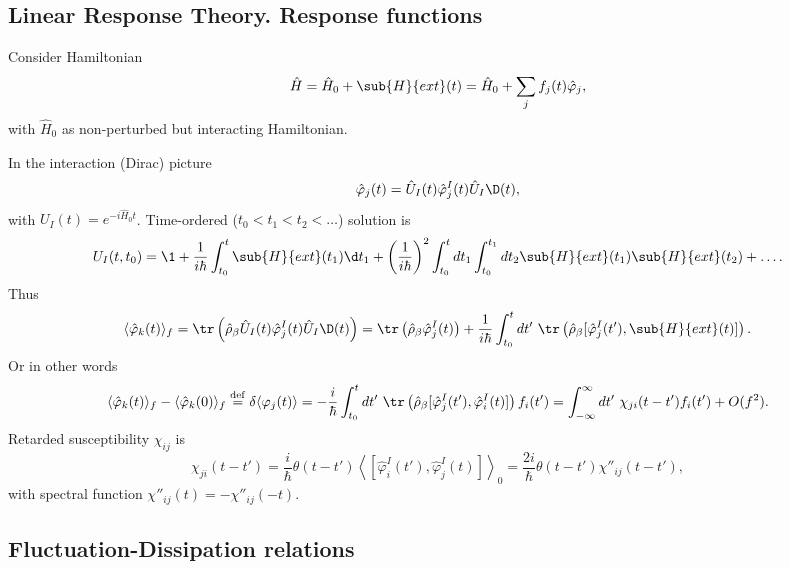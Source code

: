 \subsection*{Linear Response Theory. Response functions}

Consider Hamiltonian
\begin{equation*}
	\hat{H} = \hat{H}_0 + \sub{H}{ext}(t) = \hat{H}_0 + \sum_j f_j(t) \hat{\varphi}_j,
\end{equation*}
with $\hat{H}_0$ as non-perturbed but interacting Hamiltonian. 

In the interaction (Dirac) picture
\begin{equation*}
	\hat{\varphi}_j (t) = \hat{U}_I(t) \hat{\varphi}^I_j(t) \hat{U}_I\D(t),
\end{equation*}
with $U_I(t) = e^{- i \hat{H}_0 t}$. Time-ordered ($t_0 < t_1 < t_2 < \ldots$) solution is
\begin{equation*}
	U_I(t, t_0) = \1 + \frac{1}{i \hbar} \int_{t_0}^{t}  \sub{H}{ext}(t_1)  \d t_1 + 
	\left(\frac{1}{i\hbar}\right)^2 \int_{t_0}^{t}  dt_1 \int_{t_0}^{t_1} dt_2 \sub{H}{ext}(t_1) \sub{H}{ext}(t_2) + \ldots.
\end{equation*}
Thus 
\begin{align*}
	\langle \hat{\varphi}_k(t)\rangle_f = \tr\left(
		\hat{\rho}_\beta \hat{U}_I(t) \hat{\varphi}_j^I(t) \hat{U}_I\D(t)
	\right) = \tr\left(
		\hat{\rho}_\beta \hat{\varphi}_j^I(t)
	\right) + \frac{1}{i\hbar} \int_{t_0}^{t} dt' \ \tr\left(
		\hat{\rho}_\beta [\hat{\varphi}^I_j(t'), \sub{H}{ext}(t)]
	\right).
\end{align*}
Or in other words
\begin{equation}
	\langle \hat{\varphi}_k(t)\rangle_f - \langle \hat{\varphi}_k(0)\rangle_f 
	\overset{\mathrm{def}}{=} 
	\delta \langle \varphi_j(t)\rangle
	=
	 - \frac{i}{\hbar}  \int_{t_0}^{t} dt' \ \tr\left(
		\hat{\rho}_\beta [\hat{\varphi}^I_j(t'), \hat{\varphi}^I_i(t)]
	\right) f_i(t') 
	= \int_{-\infty}^{\infty} dt'\ \chi_{ji}(t-t') f_i (t') + O(f^2).
\end{equation}
Retarded susceptibility $\chi_{ij}$ is
\begin{equation}
	\chi_{ji}(t-t') = \frac{i}{\hbar} \theta(t-t') \left\langle [\hat{\varphi}^I_i(t'), \hat{\varphi}^I_j(t)]\right\rangle_0 = \frac{2i}{\hbar} \theta(t-t') \chi''_{ij}(t-t'),
\end{equation}
with spectral function $\chi''_{ij}(t) = - \chi''_{ij}(-t)$.




\subsection*{Fluctuation-Dissipation relations}


